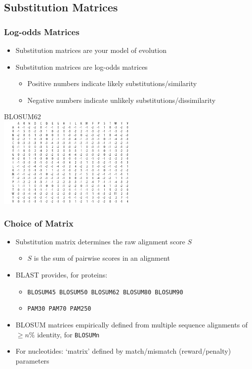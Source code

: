 %

\subsection{Substitution Matrices}
\begin{frame}
  \frametitle{Log-odds Matrices}
  \begin{itemize}
    \item Substitution matrices are your model of evolution
    \item Substitution matrices are log-odds matrices
    \begin{itemize}
      \item Positive numbers indicate likely substitutions/similarity
      \item Negative numbers indicate unlikely substitutions/dissimilarity
    \end{itemize}
  \end{itemize}
  \begin{center}
   BLOSUM62 \\
   \includegraphics[width=0.5\textwidth]{images/blosum62} 
 \end{center}         
\end{frame} 

\begin{frame}
  \frametitle{Choice of Matrix}
  \begin{itemize}
    \item Substitution matrix determines the raw alignment score $S$
    \begin{itemize}
      \item $S$ is the sum of pairwise scores in an alignment
    \end{itemize}
    \item BLAST provides, for proteins:
    \begin{itemize}
      \item \texttt{BLOSUM45 BLOSUM50 BLOSUM62 BLOSUM80 BLOSUM90}
      \item \texttt{PAM30 PAM70 PAM250}
    \end{itemize}
    \item BLOSUM matrices empirically defined from multiple sequence alignments of $\geq n\%$ identity, for \texttt{BLOSUMn}
    \item For nucleotides: `matrix' defined by match/mismatch (reward/penalty) parameters
  \end{itemize}
\end{frame} 
